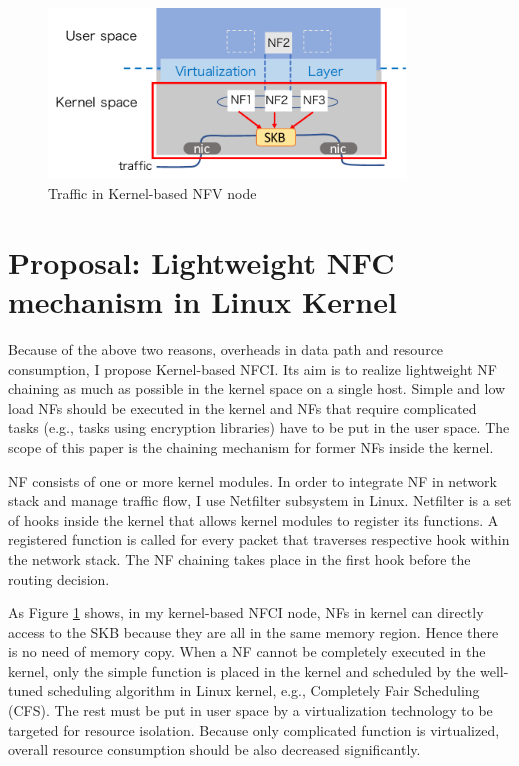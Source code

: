 \begin{figure}
	\centering
	\includegraphics[width=95mm]{pics/path_kernel.pdf}
	\caption{Traffic in Kernel-based NFV node}
	\label{fig: path_kernel}
\end{figure}

\section{Proposal: Lightweight NFC mechanism in Linux Kernel}
Because of the above two reasons, overheads in data path and resource consumption, I propose Kernel-based NFCI. Its aim is to realize lightweight NF chaining as much as possible in the kernel space on a single host. Simple and low load NFs should be executed in the kernel and NFs that require complicated tasks (e.g., tasks using encryption libraries) have to be put in the user space. The scope of this paper is the chaining mechanism for former NFs inside the kernel.

NF consists of one or more kernel modules. In order to integrate NF in network stack and manage traffic flow, I use Netfilter subsystem in Linux. Netfilter is a set of hooks inside the kernel that allows kernel modules to register its functions. A registered function is called for every packet that traverses respective hook within the network stack. The NF chaining takes place in the first hook before the routing decision. 

As Figure \ref{fig: path_kernel} shows, in my kernel-based NFCI node, NFs in kernel can directly access to the SKB because they are all in the same memory region. Hence there is no need of memory copy. When a NF cannot be completely executed in the kernel, only the simple function is placed in the kernel and scheduled by the well-tuned scheduling algorithm in Linux kernel, e.g., Completely Fair Scheduling (CFS)\cite{CFS}. The rest must be put in user space by a virtualization technology to be targeted for resource isolation. Because only complicated function is virtualized, overall resource consumption should be also decreased significantly. 

